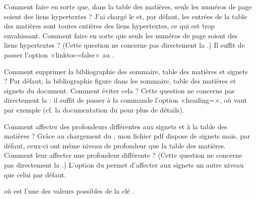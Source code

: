 \begin{dbfaq}{Comment faire en sorte que, dans la table des matières, seuls
    les numéros de page soient des liens hypertextes ?}{}
  J'ai chargé le  et, par défaut, les entrées de la table des
  matières sont toutes entières des liens hypertextes, ce qui est trop
  envahissant. Comment faire en sorte que seuls les numéros de page soient des
  liens hypertextes ?
  \tcblower
  (Cette question ne concerne pas directement la \yatcl{}.) Il suffit de passer
  l'option ×linktoc=false× au .
\end{dbfaq}

\begin{dbfaq}{Comment supprimer la bibliographie des sommaire, table des
    matières et signets ?}{}
  Par défaut, la bibliographie figure dans les sommaire, table des matières et
  signets du document. Comment éviter cela ?
  \tcblower
  Cette question ne concerne pas directement la \yatcl{} : il suffit de passer
  à la commande  l'option
  ×heading=×, où  vaut par exemple
   (cf. la documentation du  pour
  plus de détails).
\end{dbfaq}

\begin{dbfaq}{Comment affecter des profondeurs différentes aux signets et à la
    table des matières ?}{}
  Grâce au chargement du , mon fichier \acrshort{pdf} dispose
  de signets mais, par défaut, ceux-ci ont même niveau de profondeur que la
  table des matières. Comment leur affecter une profondeur différente ?
  \tcblower
  (Cette question ne concerne pas directement la \yatcl{}.) L'option
   du  permet d'affecter aux signets un
  autre niveau que celui par défaut.
\begin{preamblecode}[title=Par exemple dans le \File{\configurationfile}]
\end{preamblecode}
où  est l'une des valeurs possibles de la clé
.
\end{dbfaq}

